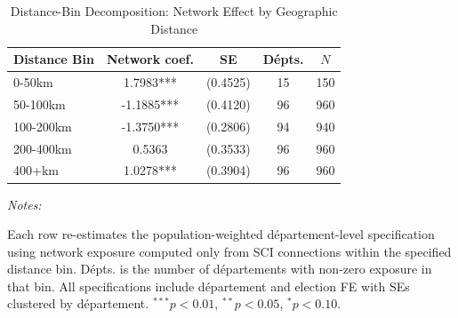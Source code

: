 \begin{table}[!h]
\centering
\caption{Distance-Bin Decomposition: Network Effect by Geographic Distance}
\centering
\fontsize{10}{12}\selectfont
\begin{threeparttable}
\begin{tabular}[t]{lcccc}
\toprule
Distance Bin & Network coef. & SE & D\'{e}pts. & $N$\\
\midrule
0-50km & 1.7983*** & (0.4525) & 15 & 150\\
50-100km & -1.1885*** & (0.4120) & 96 & 960\\
100-200km & -1.3750*** & (0.2806) & 94 & 940\\
200-400km & 0.5363 & (0.3533) & 96 & 960\\
400+km & 1.0278*** & (0.3904) & 96 & 960\\
\bottomrule
\end{tabular}
\begin{tablenotes}
\item \textit{Notes:} 
\item Each row re-estimates the population-weighted d\'{e}partement-level specification using network exposure computed only from SCI connections within the specified distance bin. D\'{e}pts. is the number of d\'{e}partements with non-zero exposure in that bin. All specifications include d\'{e}partement and election FE with SEs clustered by d\'{e}partement. $^{***}p<0.01$, $^{**}p<0.05$, $^{*}p<0.10$.
\end{tablenotes}
\end{threeparttable}
\end{table}
